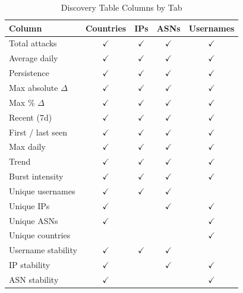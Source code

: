 \documentclass[conference]{IEEEtran}
\begin{document}
\begin{table}[t]
  \centering
  \caption{Discovery Table Columns by Tab}
  \label{tab:columns}
  \begin{tabular}{@{}lcccc@{}}
    \toprule
    \textbf{Column} & \textbf{Countries} & \textbf{IPs} & \textbf{ASNs} & \textbf{Usernames} \\
    \midrule
    Total attacks                  & $\checkmark$ & $\checkmark$ & $\checkmark$ & $\checkmark$ \\
    Average daily                  & $\checkmark$ & $\checkmark$ & $\checkmark$ & $\checkmark$ \\
    Persistence                    & $\checkmark$ & $\checkmark$ & $\checkmark$ & $\checkmark$ \\
    Max absolute $\Delta$          & $\checkmark$ & $\checkmark$ & $\checkmark$ & $\checkmark$ \\
    Max \% $\Delta$                & $\checkmark$ & $\checkmark$ & $\checkmark$ & $\checkmark$ \\
    Recent (7d)                    & $\checkmark$ & $\checkmark$ & $\checkmark$ & $\checkmark$ \\
    First / last seen              & $\checkmark$ & $\checkmark$ & $\checkmark$ & $\checkmark$ \\
    Max daily                      & $\checkmark$ & $\checkmark$ & $\checkmark$ & $\checkmark$ \\
    Trend                          & $\checkmark$ & $\checkmark$ & $\checkmark$ & $\checkmark$ \\
    Burst intensity                & $\checkmark$ & $\checkmark$ & $\checkmark$ & $\checkmark$ \\
    \midrule
    Unique usernames               & $\checkmark$ & $\checkmark$ & $\checkmark$ &              \\
    Unique IPs                     & $\checkmark$ &              & $\checkmark$ & $\checkmark$ \\
    Unique ASNs                    & $\checkmark$ &              &              & $\checkmark$ \\
    Unique countries               &              &              &              & $\checkmark$ \\
    Username stability             & $\checkmark$ & $\checkmark$ & $\checkmark$ &              \\
    IP stability                   & $\checkmark$ &              & $\checkmark$ & $\checkmark$ \\
    ASN stability                  & $\checkmark$ &              &              & $\checkmark$ \\

\end{tabular}
\end{table}
\end{document}
